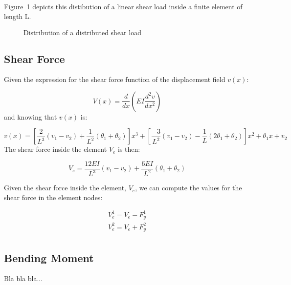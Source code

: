 Figure~\ref{fig:beam_finite_element_load_distribution} depicts this distibution of a linear shear load inside a finite element of length L.

\begin{figure}[h]
  \label{fig:beam_finite_element_load_distribution}
  \centering
  \caption{Distribution of a distributed shear load}
\end{figure}


\subsection{Shear Force}

Given the expression for the shear force function of the displacement field $v(x)$:

\begin{equation}
  V(x) = \frac{d}{dx} \left( EI \frac{d^2v}{dx^2} \right)
\end{equation}
and knowing that $v(x)$ is:

\[
  v(x) = 
  \left[ \frac{2}{L^3} \left( v_1 - v_2 \right) + \frac{1}{L^2} \left( \theta_1 + \theta_2 \right) \right] x^3
  + \left[ \frac{-3}{L^2} \left( v_1 - v_2 \right) - \frac{1}{L} \left( 2 \theta_1 + \theta_2 \right) \right] x^2
  + \theta_1 x + v_2
\]
The shear force inside the element $V_e$ is then:

\[
  V_e = \frac{12EI}{L^3} \left( v_1 - v_2 \right) + \frac{6EI}{L^2} \left( \theta_1 + \theta_2 \right)
\]

Given the shear force inside the element, $V_e$, we can compute the values for the shear force in the element nodes:

\[
  \begin{split}
    V_e^1 = V_e - F_y^1 \\
    V_e^2 = V_e + F_y^2 \\
  \end{split}  
\]

\subsection{Bending Moment}

Bla bla bla...
